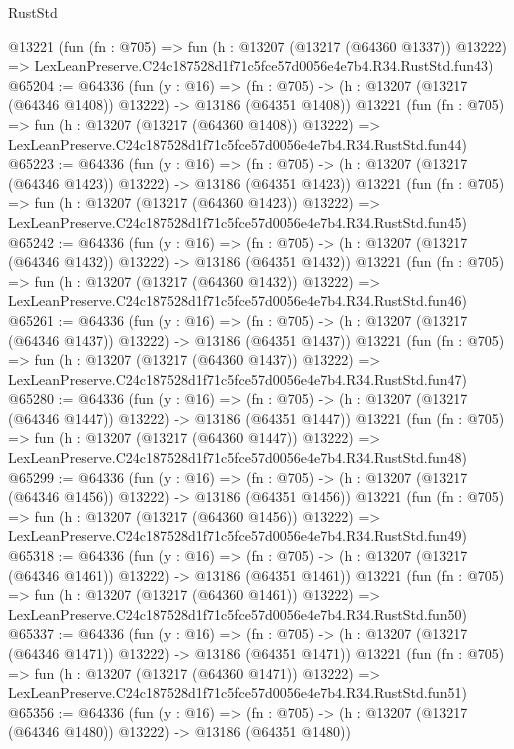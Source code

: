 \begin{lexlean}{RustStd}
\begin{coremodule}
    @13221
    (fun (fn : @705) =>
    fun (h : @13207 (@13217 (@64360 @1337)) @13222) =>
    LexLeanPreserve.C24c187528d1f71c5fce57d0056e4e7b4.R34.RustStd.fun43)
@65204 := @64336
    (fun (y : @16) =>
    (fn : @705) -> (h : @13207 (@13217 (@64346 @1408)) @13222) -> @13186 (@64351 @1408))
    @13221
    (fun (fn : @705) =>
    fun (h : @13207 (@13217 (@64360 @1408)) @13222) =>
    LexLeanPreserve.C24c187528d1f71c5fce57d0056e4e7b4.R34.RustStd.fun44)
@65223 := @64336
    (fun (y : @16) =>
    (fn : @705) -> (h : @13207 (@13217 (@64346 @1423)) @13222) -> @13186 (@64351 @1423))
    @13221
    (fun (fn : @705) =>
    fun (h : @13207 (@13217 (@64360 @1423)) @13222) =>
    LexLeanPreserve.C24c187528d1f71c5fce57d0056e4e7b4.R34.RustStd.fun45)
@65242 := @64336
    (fun (y : @16) =>
    (fn : @705) -> (h : @13207 (@13217 (@64346 @1432)) @13222) -> @13186 (@64351 @1432))
    @13221
    (fun (fn : @705) =>
    fun (h : @13207 (@13217 (@64360 @1432)) @13222) =>
    LexLeanPreserve.C24c187528d1f71c5fce57d0056e4e7b4.R34.RustStd.fun46)
@65261 := @64336
    (fun (y : @16) =>
    (fn : @705) -> (h : @13207 (@13217 (@64346 @1437)) @13222) -> @13186 (@64351 @1437))
    @13221
    (fun (fn : @705) =>
    fun (h : @13207 (@13217 (@64360 @1437)) @13222) =>
    LexLeanPreserve.C24c187528d1f71c5fce57d0056e4e7b4.R34.RustStd.fun47)
@65280 := @64336
    (fun (y : @16) =>
    (fn : @705) -> (h : @13207 (@13217 (@64346 @1447)) @13222) -> @13186 (@64351 @1447))
    @13221
    (fun (fn : @705) =>
    fun (h : @13207 (@13217 (@64360 @1447)) @13222) =>
    LexLeanPreserve.C24c187528d1f71c5fce57d0056e4e7b4.R34.RustStd.fun48)
@65299 := @64336
    (fun (y : @16) =>
    (fn : @705) -> (h : @13207 (@13217 (@64346 @1456)) @13222) -> @13186 (@64351 @1456))
    @13221
    (fun (fn : @705) =>
    fun (h : @13207 (@13217 (@64360 @1456)) @13222) =>
    LexLeanPreserve.C24c187528d1f71c5fce57d0056e4e7b4.R34.RustStd.fun49)
@65318 := @64336
    (fun (y : @16) =>
    (fn : @705) -> (h : @13207 (@13217 (@64346 @1461)) @13222) -> @13186 (@64351 @1461))
    @13221
    (fun (fn : @705) =>
    fun (h : @13207 (@13217 (@64360 @1461)) @13222) =>
    LexLeanPreserve.C24c187528d1f71c5fce57d0056e4e7b4.R34.RustStd.fun50)
@65337 := @64336
    (fun (y : @16) =>
    (fn : @705) -> (h : @13207 (@13217 (@64346 @1471)) @13222) -> @13186 (@64351 @1471))
    @13221
    (fun (fn : @705) =>
    fun (h : @13207 (@13217 (@64360 @1471)) @13222) =>
    LexLeanPreserve.C24c187528d1f71c5fce57d0056e4e7b4.R34.RustStd.fun51)
@65356 := @64336
    (fun (y : @16) =>
    (fn : @705) -> (h : @13207 (@13217 (@64346 @1480)) @13222) -> @13186 (@64351 @1480))

\end{coremodule}
\end{lexlean}
